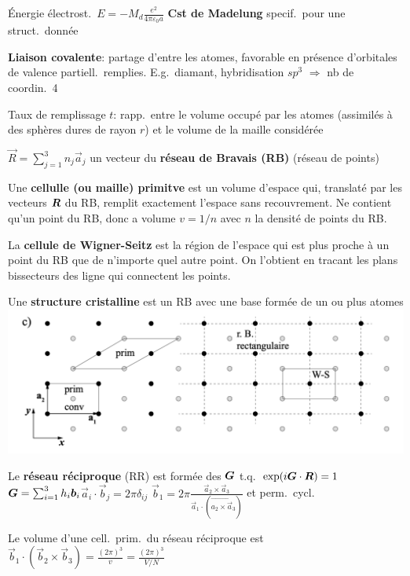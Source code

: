 \begin{squishlist}
    \item Énergie électrost.\ $E = - M_d \frac{e^2}{4\pi \varepsilon_0 a}$ \textbf{Cst de Madelung} specif.\ pour une struct.\ donnée
    \item \textbf{Liaison covalente}: partage d'\elec entre les atomes, favorable en présence d'orbitales de valence partiell.\ remplies. E.g.\ diamant, hybridisation $sp^3$ $\Rightarrow$ nb de coordin.\ 4
    \item Taux de remplissage $t$: rapp.\ entre le volume occupé par les atomes (assimilés à des sphères dures de rayon $r$) et le volume de la maille considérée
\end{squishlist}
\begin{squishlist}
    \item $\vec{R} = \sum_{j=1}^{3} n_j \vec{a}_j$ un vecteur du \textbf{réseau de Bravais (RB)} (réseau de points)
    \item Une \textbf{cellulle (ou maille) primitve} est un volume d'espace qui, translaté par les vecteurs $\bm{R}$ du RB, remplit exactement l'espace sans recouvrement. Ne contient qu'un point du RB, donc a volume $v = 1/n$ avec $n$ la densité de points du RB.
    \item La \textbf{cellule de Wigner-Seitz} est la région de l'espace qui est plus proche à un point du RB que de n'importe quel autre point. On l'obtient en tracant les plans bissecteurs des ligne qui connectent les points.
    \item Une \textbf{structure cristalline} est un RB avec une base formée de un ou plus atomes
        \includegraphics[width=0.6\columnwidth]{figures/structure-exemple.png}
    \item Le \textbf{réseau réciproque} (RR) est formée des $\bm{G}$ t.q.\ $\exp(i \bm{G} \cdot \bm{R}) = 1$ \\
    $\bm{G} = \sum_{i=1}^{3}h_i \bm{b}_i $\squishsep $\vec{a}_i \cdot \vec{b}_j = 2 \pi \delta_{ij}$ \squishsep $\vec{b}_1 = 2 \pi \frac{\vec{a}_2 \times \vec{a}_3}{\vec{a}_1 \cdot (\vec{a_2 \times \vec{a}_3})}$ et perm.\ cycl.\ 
    \item Le volume d'une cell.\ prim.\ du réseau réciproque est $\vec{b}_1 \cdot (\vec{b}_2 \times \vec{b}_3) = \frac{(2\pi)^3}{v} = \frac{(2\pi)^3}{V/N}$
\end{squishlist}    

